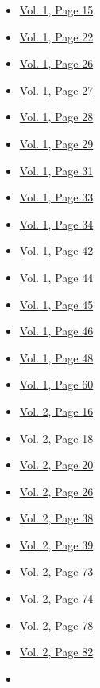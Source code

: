 \begin{itemize}
  \begin{itemize}
  \tightlist
  \item
    \protect\hyperlink{g-page-23}{Vol. 1, Page 15}
  \item
    \protect\hyperlink{g-page-30}{Vol. 1, Page 22}
  \item
    \protect\hyperlink{g-page-34}{Vol. 1, Page 26}
  \item
    \protect\hyperlink{g-page-35}{Vol. 1, Page 27}
  \item
    \protect\hyperlink{g-page-36}{Vol. 1, Page 28}
  \item
    \protect\hyperlink{g-page-37}{Vol. 1, Page 29}
  \item
    \protect\hyperlink{g-page-39}{Vol. 1, Page 31}
  \item
    \protect\hyperlink{g-page-41}{Vol. 1, Page 33}
  \item
    \protect\hyperlink{g-page-42}{Vol. 1, Page 34}
  \item
    \protect\hyperlink{g-page-50}{Vol. 1, Page 42}
  \item
    \protect\hyperlink{g-page-52}{Vol. 1, Page 44}
  \item
    \protect\hyperlink{g-page-53}{Vol. 1, Page 45}
  \item
    \protect\hyperlink{g-page-54}{Vol. 1, Page 46}
  \item
    \protect\hyperlink{g-page-56}{Vol. 1, Page 48}
  \item
    \protect\hyperlink{g-page-68}{Vol. 1, Page 60}
  \item
    \protect\hyperlink{g-page-228}{Vol. 2, Page 16}
  \item
    \protect\hyperlink{g-page-230}{Vol. 2, Page 18}
  \item
    \protect\hyperlink{g-page-232}{Vol. 2, Page 20}
  \item
    \protect\hyperlink{g-page-238}{Vol. 2, Page 26}
  \item
    \protect\hyperlink{g-page-250}{Vol. 2, Page 38}
  \item
    \protect\hyperlink{g-page-251}{Vol. 2, Page 39}
  \item
    \protect\hyperlink{g-page-285}{Vol. 2, Page 73}
  \item
    \protect\hyperlink{g-page-286}{Vol. 2, Page 74}
  \item
    \protect\hyperlink{g-page-290}{Vol. 2, Page 78}
  \item
    \protect\hyperlink{g-page-294}{Vol. 2, Page 82}
  \item

\end{itemize}
\end{itemize}
